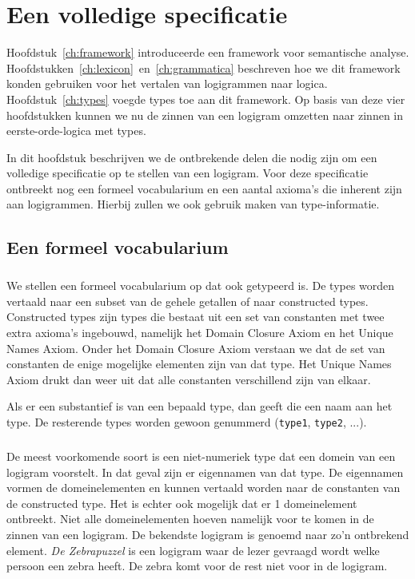\chapter{Een volledige specificatie}
\label{ch:specificatie}

Hoofdstuk~\ref{ch:framework} introduceerde een framework voor semantische analyse. Hoofdstukken~\ref{ch:lexicon}~en~\ref{ch:grammatica} beschreven hoe we dit framework konden gebruiken voor het vertalen van logigrammen naar logica. Hoofdstuk~\ref{ch:types} voegde types toe aan dit framework. Op basis van deze vier hoofdstukken kunnen we nu de zinnen van een logigram omzetten naar zinnen in eerste-orde-logica met types.

In dit hoofdstuk beschrijven we de ontbrekende delen die nodig zijn om een volledige specificatie op te stellen van een logigram. Voor deze specificatie ontbreekt nog een formeel vocabularium en een aantal axioma's die inherent zijn aan logigrammen. Hierbij zullen we ook gebruik maken van type-informatie.

\section{Een formeel vocabularium}
\label{sec:vocabularium}
\paragraph{} We stellen een formeel vocabularium op dat ook getypeerd is. De types worden vertaald naar een subset van de gehele getallen of naar constructed types. Constructed types zijn types die bestaat uit een set van constanten met twee extra axioma's ingebouwd, namelijk het Domain Closure Axiom en het Unique Names Axiom. Onder het Domain Closure Axiom verstaan we dat de set van constanten de enige mogelijke elementen zijn van dat type. Het Unique Names Axiom drukt dan weer uit dat alle constanten verschillend zijn van elkaar.

Als er een substantief is van een bepaald type, dan geeft die een naam aan het type. De resterende types worden gewoon genummerd (\texttt{type1}, \texttt{type2}, ...).

\paragraph{} De meest voorkomende soort is een niet-numeriek type dat een domein van een logigram voorstelt. In dat geval zijn er eigennamen van dat type. De eigennamen vormen de domeinelementen en kunnen vertaald worden naar de constanten van de constructed type. Het is echter ook mogelijk dat er 1 domeinelement ontbreekt. Niet alle domeinelementen hoeven namelijk voor te komen in de zinnen van een logigram. De bekendste logigram is genoemd naar zo'n ontbrekend element. \textit{De Zebrapuzzel} \cite{zebra} is een logigram waar de lezer gevraagd wordt welke persoon een zebra heeft. De zebra komt voor de rest niet voor in de logigram.

